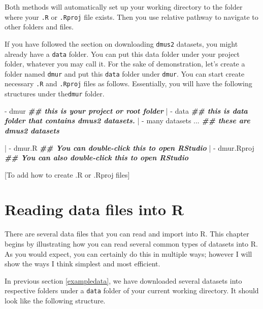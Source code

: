 \documentclass[
]{book}
\newenvironment{Shaded}{\begin{snugshade}}{\end{snugshade}}
\newcommand{\DocumentationTok}[1]{\textcolor[rgb]{0.56,0.35,0.01}{\textbf{\textit{#1}}}}
\newcommand{\NormalTok}[1]{#1}
\newcommand{\SpecialCharTok}[1]{\textcolor[rgb]{0.00,0.00,0.00}{#1}}
\begin{document}
Both methods will automatically set up your working directory to the folder where your \texttt{.R} or \texttt{.Rproj} file exists. Then you use relative pathway to navigate to other folders and files.

If you have followed the section on downloading \texttt{dmus2} datasets, you might already have a \texttt{data} folder. You can put this data folder under your project folder, whatever you may call it. For the sake of demonstration, let's create a folder named \texttt{dmur} and put this \texttt{data} folder under \texttt{dmur}. You can start create necessary \texttt{.R} and \texttt{.Rproj} files as follows. Essentially, you will have the following structures under the\texttt{dmur} folder.

\begin{Shaded}
\begin{Highlighting}[]
\SpecialCharTok{{-}}\NormalTok{ dmur              }\DocumentationTok{\#\# this is your project or root folder}
    \SpecialCharTok{|}
    \SpecialCharTok{{-}}\NormalTok{ data          }\DocumentationTok{\#\# this is data folder that contains \textasciigrave{}dmus2\textasciigrave{} datasets.}
        \SpecialCharTok{|}
        \SpecialCharTok{{-}}\NormalTok{ many datasets ...     }\DocumentationTok{\#\# these are \textasciigrave{}dmus2\textasciigrave{} datasets}

    \SpecialCharTok{|}
    \SpecialCharTok{{-}}\NormalTok{ dmur.R  }\DocumentationTok{\#\# You can double{-}click this to open RStudio }
    \SpecialCharTok{|}
    \SpecialCharTok{{-}}\NormalTok{ dmur.Rproj  }\DocumentationTok{\#\# You can also double{-}click this to open RStudio}
\end{Highlighting}
\end{Shaded}

{[}To add how to create .R or .Rproj files{]}

\hypertarget{reading-data-files-into-r}{%
\section{Reading data files into R}\label{reading-data-files-into-r}}

There are several data files that you can read and import into R. This chapter begins by illustrating how you can read several common types of datasets into R. As you would expect, you can certainly do this in multiple ways; however I will show the ways I think simplest and most efficient.

In previous section \ref{exampledata}, we have downloaded several datasets into respective folders under a \texttt{data} folder of your current working directory. It should look like the following structure.
\end{document}
